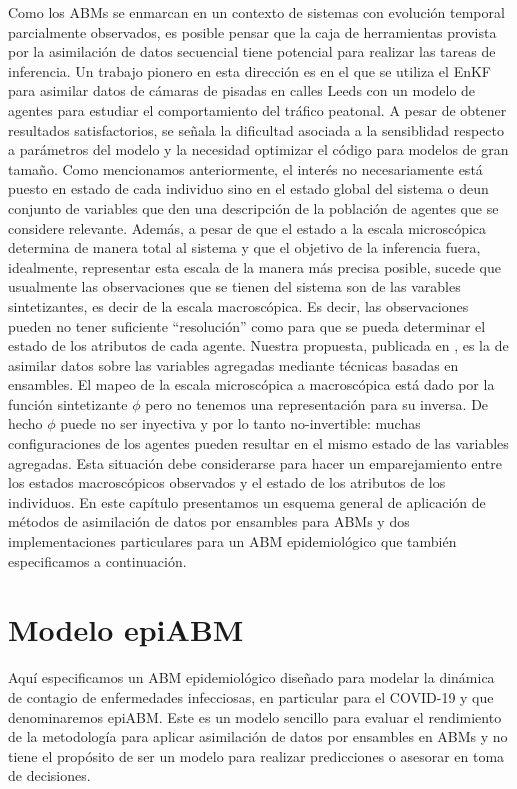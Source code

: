 Como los ABMs se enmarcan en un contexto de sistemas con evolución temporal parcialmente observados, es posible pensar que la caja de herramientas provista por la asimilación de datos secuencial tiene potencial para realizar las tareas de inferencia. Un trabajo pionero en esta dirección es \cite{Ward2016} en el que se utiliza el EnKF para asimilar datos de cámaras de pisadas en calles Leeds con un modelo de agentes para estudiar el comportamiento del tráfico peatonal. A pesar de obtener resultados satisfactorios, se señala la dificultad asociada a la sensiblidad respecto a parámetros del modelo y la necesidad optimizar el código para modelos de gran tamaño. Como mencionamos anteriormente, el interés no necesariamente está puesto en estado de cada individuo sino en el estado global del sistema o deun conjunto de variables que den una descripción de la población de agentes que se considere relevante. Además, a pesar de que el estado a la escala microscópica determina de manera total al sistema y que el objetivo de la inferencia fuera, idealmente, representar esta escala de la manera más precisa posible, sucede que usualmente las observaciones que se tienen del sistema son de las varables sintetizantes, es decir de la escala macroscópica. Es decir, las observaciones pueden no tener suficiente ``resolución'' como para que se pueda determinar el estado de los atributos de cada agente. Nuestra propuesta, publicada en \cite{Cocucci2022}, es la de asimilar datos sobre las variables agregadas mediante técnicas basadas en ensambles. El mapeo de la escala microscópica a macroscópica está dado por la función sintetizante $\phi$ pero no tenemos una representación para su inversa. De hecho $\phi$ puede no ser inyectiva y por lo tanto no-invertible: muchas configuraciones de los agentes pueden resultar en el mismo estado de las variables agregadas. Esta situación debe considerarse para hacer un emparejamiento entre los estados macroscópicos observados y el estado de los atributos de los individuos. En este capítulo presentamos un esquema general de aplicación de métodos de asimilación de datos por ensambles para ABMs y dos implementaciones particulares para un ABM epidemiológico que también especificamos a continuación.

\section{Modelo epiABM} \label{sec:epi_abm}

Aquí especificamos un ABM epidemiológico diseñado para modelar la dinámica de contagio de enfermedades infecciosas, en particular para el COVID-19 y que denominaremos epiABM. Este es un modelo sencillo para evaluar el rendimiento de la metodología para aplicar asimilación de datos por ensambles en ABMs y no tiene el propósito de ser un modelo para realizar predicciones o asesorar en toma de decisiones.

